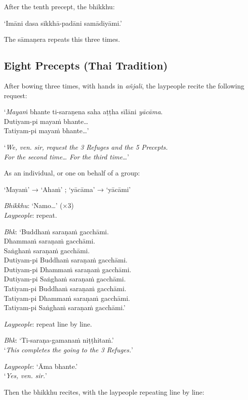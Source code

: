 After the tenth precept, the bhikkhu:

‘Imāni dasa sikkhā-padāni samādiyāmi.’

The sāmaṇera repeats this three times.


\subsection{Eight Precepts (Thai Tradition)}


After bowing three times, with hands in \emph{añjali}, the laypeople recite the
following request:

‘\emph{Mayaṁ} bhante ti-saraṇena saha aṭṭha sīlāni \emph{yācāma}.\\
Dutiyam-pi mayaṁ bhante…\\
Tatiyam-pi mayaṁ bhante…’

‘\emph{We, ven. sir, request the 3 Refuges and the 5 Precepts.\\
  For the second time… For the third time…}’

As an individual, or one on behalf of a group:

‘Mayaṁ’ → ‘Ahaṁ’ ; ‘yācāma’ → ‘yācāmi’

\emph{Bhikkhu}: ‘Namo…’ (×3)\\
\emph{Laypeople}: repeat.

\emph{Bhk}: ‘Buddhaṁ saraṇaṁ gacchāmi.\\
Dhammaṁ saraṇaṁ gacchāmi.\\
Saṅghaṁ saraṇaṁ gacchāmi.\\
Dutiyam-pi Buddhaṁ saraṇaṁ gacchāmi.\\
Dutiyam-pi Dhammaṁ saraṇaṁ gacchāmi.\\
Dutiyam-pi Saṅghaṁ saraṇaṁ gacchāmi.\\
Tatiyam-pi Buddhaṁ saraṇaṁ gacchāmi.\\
Tatiyam-pi Dhammaṁ saraṇaṁ gacchāmi.\\
Tatiyam-pi Saṅghaṁ saraṇaṁ gacchāmi.’

\emph{Laypeople}: repeat line by line.

\emph{Bhk}: ‘Ti-saraṇa-gamanaṁ niṭṭhitaṁ.’\\
‘\emph{This completes the going to the 3 Refuges.}’

\emph{Laypeople}: ‘Āma bhante.’\\
‘\emph{Yes, ven. sir.}’

Then the bhikkhu recites, with the laypeople repeating line by line:

